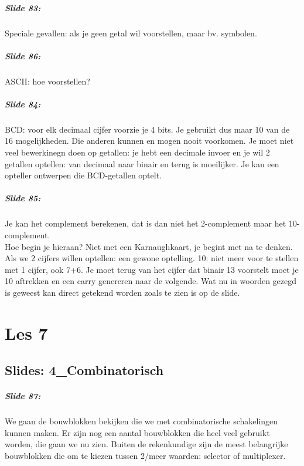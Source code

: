 \documentclass[10pt,a4paper]{book}
\begin{document}
\paragraph{Slide 83:} Speciale gevallen: als je geen getal wil voorstellen, maar bv. symbolen.

\paragraph{Slide 86:} ASCII: hoe voorstellen?

\paragraph{Slide 84:} BCD: voor elk decimaal cijfer voorzie je 4 bits. Je gebruikt dus maar 10 van de 16 mogelijkheden. Die anderen kunnen en mogen nooit voorkomen. Je moet niet veel bewerkinegn doen op getallen: je hebt een decimale invoer en je wil 2 getallen optellen: van decimaal naar binair en terug is moeilijker. Je kan een opteller ontwerpen die BCD-getallen optelt.

\paragraph{Slide 85:} Je kan het complement berekenen, dat is dan niet het 2-complement maar het 10-complement.\\
Hoe begin je hieraan? Niet met een Karnaughkaart, je begint met na te denken. Als we 2 cijfers willen optellen: een gewone optelling. 10: niet meer voor te stellen met 1 cijfer, ook 7+6. Je moet terug van het cijfer dat binair 13 voorstelt moet je 10 aftrekken en een carry genereren naar de volgende. Wat nu in woorden gezegd is geweest kan direct getekend worden zoals te zien is op de slide. 

\chapter{Les 7}

\section{Slides: 4\_Combinatorisch}

\paragraph{Slide 87:} We gaan de bouwblokken bekijken die we met combinatorische schakelingen kunnen maken. Er zijn nog een aantal bouwblokken die heel veel gebruikt worden, die gaan we nu zien. Buiten de rekenkundige zijn de meest belangrijke bouwblokken die om te kiezen tussen 2/meer waarden: selector of multiplexer.
\end{document}

